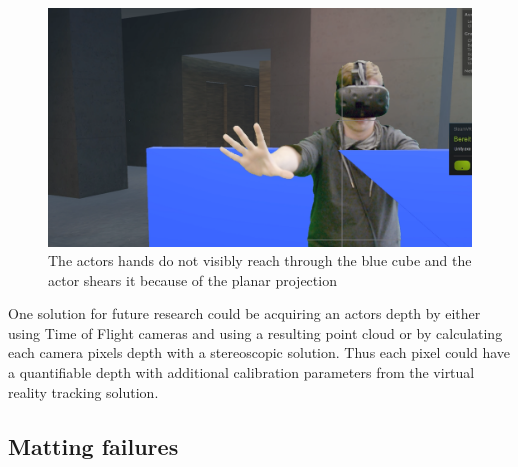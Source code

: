\begin{figure}[htb]
	\centering
	\includegraphics[width=\textwidth]{gfx/issues/z-clipping.png}
	\caption{The actors hands do not visibly reach through the blue cube and 
	the actor shears it because of the planar projection}
	\label{fig:edge:z-clipping}
\end{figure}

One solution for future research could be acquiring an actors depth by either 
using Time of Flight cameras and using a resulting point cloud or by 
calculating each camera pixels depth with a stereoscopic solution. Thus each 
pixel could have a quantifiable depth with additional calibration parameters 
from the virtual reality tracking solution.

\subsection{Matting failures}

